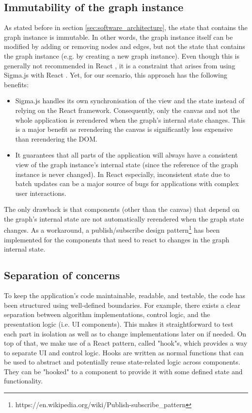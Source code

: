 \documentclass{l4proj}
\begin{document}
\subsection{Immutability of the graph instance}
\label{sec:immutability}
As stated before in section \ref{sec:software_architecture}, the state that contains the graph instance is immutable. In other words, the graph instance itself can be modified by adding or removing nodes and edges, but not the state that contains the graph instance (e.g. by creating a new graph instance).
Even though this is generally not recommended in React \citep{React_update_object_state}, it is a constraint that arises from using Sigma.js with React \citep{React_sigma_js}. Yet, for our scenario, this approach has the following benefits:
\begin{itemize}
    \item Sigma.js handles its own synchronisation of the view and the state instead of relying on the React framework. Consequently, only the canvas and not the whole application is rerendered when the graph's internal state changes. This is a major benefit as rerendering the canvas is significantly less expensive than rerendering the DOM.
    \item It guarantees that all parts of the application will always have a consistent view of the graph instance's internal state (since the reference of the graph instance is never changed). In React especially, inconsistent state due to batch updates can be a major source of bugs for applications with complex user interactions.
\end{itemize}

The only drawback is that components (other than the canvas) that depend on the graph's internal state are not automatically rerendered when the graph state changes. As a workaround, a publish/subscribe design pattern\footnote{https://en.wikipedia.org/wiki/Publish-subscribe\_pattern} has been implemented for the components that need to react to changes in the graph internal state.


\subsection{Separation of concerns}
To keep the application's code maintainable, readable, and testable, the code has been structured using well-defined boundaries. For example, there exists a clear separation between algorithm implementations, control logic, and the presentation logic (i.e. UI components). This makes it straightforward to test each part in isolation as well as to change implementations later on if needed. On top of that, we make use of a React pattern, called "hook"s, which provides a way to separate UI and control logic. Hooks are written as normal functions that can be used to abstract and potentially reuse state-related logic across components. They can be "hooked" to a component to provide it with some defined state and functionality.
\end{document}
